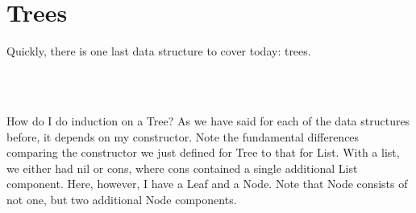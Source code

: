 \documentclass{lecturenotes}
\begin{document}
\begin{center}
\begin{code}
\AgdaSymbol{(}\AgdaSpace{}%
\AgdaSymbol{)}\AgdaSpace{}%
\AgdaSymbol{(}\AgdaSpace{}%
\AgdaSpace{}%
\AgdaSpace{}%
\AgdaSymbol{)}\AgdaSpace{}%
\<%
\\
\>[424I][@{}l@{\AgdaIndent{0}}]%
\>[16]\AgdaSpace{}%
\AgdaSpace{}%
\AgdaSymbol{(}\AgdaSpace{}%
\AgdaOperator{\AgdaFunction{++}}\AgdaSpace{}%
\AgdaSymbol{)}\AgdaSpace{}%
\AgdaOperator{\AgdaFunction{++}}\AgdaSpace{}%
\<%
\\
%
\>[12]\<%
\end{code}
\end{center}

\vspace{0.2in}

\section{Trees}
\label{sec:tree-types}

Quickly, there is one last data structure to cover today: trees.

\begin{center}
    \begin{code}%
%
\>[8]\AgdaSpace{}%
\AgdaSpace{}%
\AgdaSymbol{(}\AgdaSpace{}%
\AgdaSymbol{:}\AgdaSpace{}%
\AgdaSymbol{)}\AgdaSpace{}%
\AgdaSymbol{:}\AgdaSpace{}%
\AgdaSpace{}%
\<%
\\
\>[8][@{}l@{\AgdaIndent{0}}]%
\>[12]\AgdaSpace{}%
\AgdaSymbol{:}\AgdaSpace{}%
\AgdaSpace{}%
\<%
\\
%
\>[12]\AgdaSpace{}%
\AgdaSymbol{:}\AgdaSpace{}%
\AgdaSpace{}%
\AgdaSpace{}%
\AgdaSymbol{->}\AgdaSpace{}%
\AgdaSpace{}%
\AgdaSymbol{->}\AgdaSpace{}%
\AgdaSpace{}%
\AgdaSpace{}%
\AgdaSymbol{->}\AgdaSpace{}%
\AgdaSpace{}%
\<%
\end{code}
\end{center}

\pagebreak

How do I do induction on a Tree? 
As we have said for each of the data structures before, it depends on my constructor. 
Note the fundamental differences comparing the constructor we just defined for Tree to that for List. 
With a list, we either had nil or cons, where cons contained a single additional List component.
Here, however, I have a Leaf and a Node.
Note that Node consists of not one, but two additional Node components.
\end{document}
